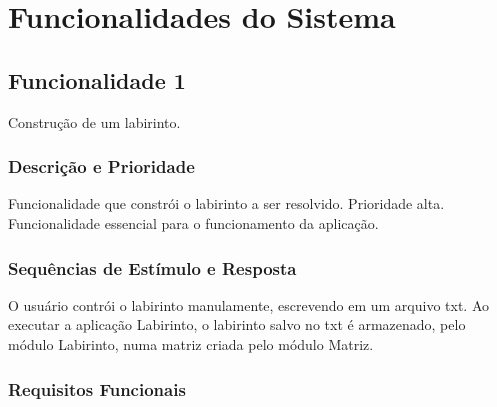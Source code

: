 \chapter{Funcionalidades do Sistema}

\section{Funcionalidade 1}

Construção de um labirinto.

\subsection{Descrição e Prioridade}

Funcionalidade que constrói o labirinto a ser resolvido. Prioridade alta. Funcionalidade essencial para o funcionamento da aplicação.

\subsection{Sequências de Estímulo e Resposta}
O usuário contrói o labirinto manulamente, escrevendo em um arquivo txt. Ao executar a aplicação Labirinto, o labirinto salvo no txt é armazenado, pelo módulo Labirinto, numa matriz criada pelo módulo Matriz.

\subsection{Requisitos Funcionais}


